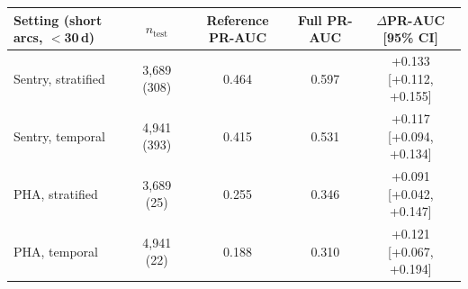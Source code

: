 \begin{tabular}{lcccc}
\toprule
Setting (short arcs, $<$30\,d) & $n_{\mathrm{test}}$ & Reference PR-AUC & Full PR-AUC & $\Delta$PR-AUC [95\% CI]\\
\midrule
Sentry, stratified & 3,689 (308) & 0.464 & 0.597 & +0.133 [+0.112, +0.155]\\
Sentry, temporal & 4,941 (393) & 0.415 & 0.531 & +0.117 [+0.094, +0.134]\\
PHA, stratified & 3,689 (25) & 0.255 & 0.346 & +0.091 [+0.042, +0.147]\\
PHA, temporal & 4,941 (22) & 0.188 & 0.310 & +0.121 [+0.067, +0.194]\\
\bottomrule
\end{tabular}
